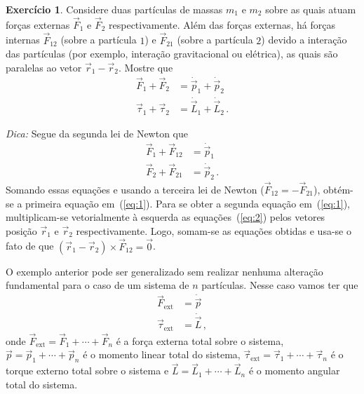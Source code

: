 \documentclass[papersize=a4,DIV=calc,twocolumn=on]{scrartcl}
\theoremstyle{definition}
\newtheorem{ex}{Exercício}[section]
\begin{document}
\begin{ex}
  Considere duas partículas de massas $m_1$ e $m_2$ sobre as quais
  atuam forças externas $\vec F_1$ e $\vec F_2$ respectivamente. Além
  das forças externas, há forças internas $\vec F_{12}$ (sobre a
  partícula $1$) e $\vec F_{21}$ (sobre a partícula $2$) devido a
  interação das partículas (por exemplo, interação gravitacional ou
  elétrica), as quais são paralelas ao vetor $\vec r_1-\vec
  r_2$. Mostre que
  \begin{equation}
    \label{eq:1}
    \begin{split}
      \vec F_1+\vec F_2&=\dot{\vec p}_1+\dot{\vec p}_2\\
      \vec\tau_1+\vec\tau_2&=\dot{\vec L}_1+\dot{\vec L}_2\,.
    \end{split}
  \end{equation}

  \noindent\textit{Dica:} Segue da segunda lei de Newton que
  \begin{equation}
    \label{eq:2}
    \begin{split}
      \vec F_1+\vec F_{12}&=\dot{\vec p}_1\\
      \vec F_2+\vec F_{21}&=\dot{\vec p}_2\,.
    \end{split}
  \end{equation}
  Somando essas equações e usando a terceira lei de Newton
  ($\vec F_{12}=-\vec F_{21}$), obtém-se a primeira equação
  em~(\ref{eq:1}). Para se obter a segunda equação em~(\ref{eq:1}),
  multiplicam-se vetorialmente à esquerda as equações~(\ref{eq:2})
  pelos vetores posição $\vec r_1$ e $\vec r_2$ respectivamente. Logo,
  somam-se as equações obtidas e usa-se o fato de que
  $(\vec r_1-\vec r_2)\times\vec F_{12}=\vec 0$.
\end{ex}

O exemplo anterior pode ser generalizado sem realizar nenhuma
alteração fundamental para o caso de um sistema de $n$
partículas. Nesse caso vamos ter que
\begin{equation}
  \label{eq:3}
  \begin{split}
    \vec F_{\mathrm{ext}}&=\dot{\vec p}\\
    \vec \tau_{\mathrm{ext}}&=\dot{\vec L}\,,
  \end{split}
\end{equation}
onde $\vec F_{\mathrm{ext}}=\vec F_1+\cdots+\vec F_n$ é a força
externa total sobre o sistema, $\vec p=\vec p_1+\cdots+\vec p_n$ é o
momento linear total do sistema,
$\vec\tau_{\mathrm{ext}}=\vec\tau_1+\cdots+\vec\tau_n$ é o torque
externo total sobre o sistema e $\vec L=\vec L_1+\cdots+\vec L_n$ é o
momento angular total do sistema.
\end{document}
